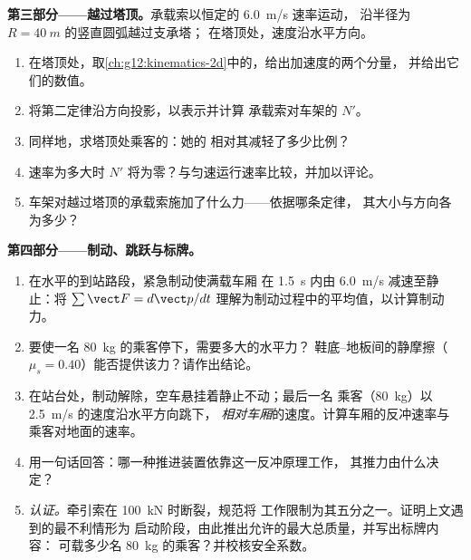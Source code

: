 \begin{problem}
\medskip
\noindent\textbf{第三部分——越过塔顶。}承载索以恒定的 \qty{6.0}{m/s} 速率运动，
沿半径为 $R = \qty{40}{m}$ 的竖直圆弧越过支承塔；
在塔顶处，速度沿水平方向。
\begin{enumerate}[resume]
  \item 在塔顶处，取\cref{ch:g12:kinematics-2d}中的，给出加速度的两个分量，
        并给出它们的数值。
  \item 将第二定律沿方向投影，以表示并计算
        承载索对车架的 $N'$。
  \item 同样地，求塔顶处乘客的：她的
        相对其减轻了多少比例？
  \item 速率为多大时 $N'$ 将为零？与匀速运行速率比较，并加以评论。
  \item 车架对越过塔顶的承载索施加了什么力——依据哪条定律，
        其大小与方向各为多少？
\end{enumerate}

\medskip
\noindent\textbf{第四部分——制动、跳跃与标牌。}
\begin{enumerate}[resume]
  \item 在水平的到站路段，紧急制动使满载车厢
        在 \qty{1.5}{s} 内由 \qty{6.0}{m/s} 减速至静止：将 $\sum \vect F = d\vect p/dt$
        理解为制动过程中的平均值，以计算制动力。
  \item 要使一名 \qty{80}{kg} 的乘客停下，需要多大的水平力？
        鞋底–地板间的静摩擦（$\mu_s = 0.40$）能否提供该力？请作出结论。
  \item 在站台处，制动解除，空车悬挂着静止不动；最后一名
        乘客（\qty{80}{kg}）以 \qty{2.5}{m/s} 的速度沿水平方向跳下，
        \emph{相对车厢}的速度。计算车厢的反冲速率与
        乘客对地面的速率。
  \item 用一句话回答：哪一种推进装置依靠这一反冲原理工作，
        其推力由什么决定？
  \item \emph{认证。}牵引索在 \qty{100}{kN} 时断裂，规范将
        工作限制为其五分之一。证明上文遇到的最不利情形为
        启动阶段，由此推出允许的最大总质量，并写出标牌内容：
        可载多少名 \qty{80}{kg} 的乘客？并校核安全系数。
\end{enumerate}
\end{problem}

